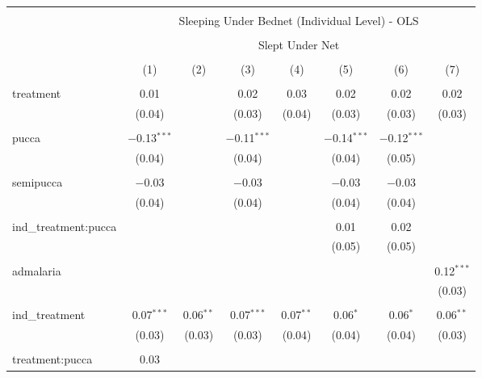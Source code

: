 
\begin{table}[!htbp] \centering 
  \caption{} 
  \label{tbl:Sleeping Under Bednet (Individual Level) - OLS} 
\small 
\begin{tabular}{@{\extracolsep{5pt}}lccccccc} 
\\[-1.8ex]\hline 
\hline \\[-1.8ex] 
 & \multicolumn{7}{c}{Sleeping Under Bednet (Individual Level) - OLS} \\ 
\cline{2-8} 
\\[-1.8ex] & \multicolumn{7}{c}{Slept Under Net} \\ 
\\[-1.8ex] & (1) & (2) & (3) & (4) & (5) & (6) & (7)\\ 
\hline \\[-1.8ex] 
 treatment & 0.01 &  & 0.02 & 0.03 & 0.02 & 0.02 & 0.02 \\ 
  & (0.04) &  & (0.03) & (0.04) & (0.03) & (0.03) & (0.03) \\ 
  & & & & & & & \\ 
 pucca & $-$0.13$^{***}$ &  & $-$0.11$^{***}$ &  & $-$0.14$^{***}$ & $-$0.12$^{***}$ &  \\ 
  & (0.04) &  & (0.04) &  & (0.04) & (0.05) &  \\ 
  & & & & & & & \\ 
 semipucca & $-$0.03 &  & $-$0.03 &  & $-$0.03 & $-$0.03 &  \\ 
  & (0.04) &  & (0.04) &  & (0.04) & (0.04) &  \\ 
  & & & & & & & \\ 
 ind\_treatment:pucca &  &  &  &  & 0.01 & 0.02 &  \\ 
  &  &  &  &  & (0.05) & (0.05) &  \\ 
  & & & & & & & \\ 
 admalaria &  &  &  &  &  &  & 0.12$^{***}$ \\ 
  &  &  &  &  &  &  & (0.03) \\ 
  & & & & & & & \\ 
 ind\_treatment & 0.07$^{***}$ & 0.06$^{**}$ & 0.07$^{***}$ & 0.07$^{**}$ & 0.06$^{*}$ & 0.06$^{*}$ & 0.06$^{**}$ \\ 
  & (0.03) & (0.03) & (0.03) & (0.04) & (0.04) & (0.04) & (0.03) \\ 
  & & & & & & & \\ 
 treatment:pucca & 0.03 &  &  &  &  &  &  \\ 

\end{tabular}
\end{table}
